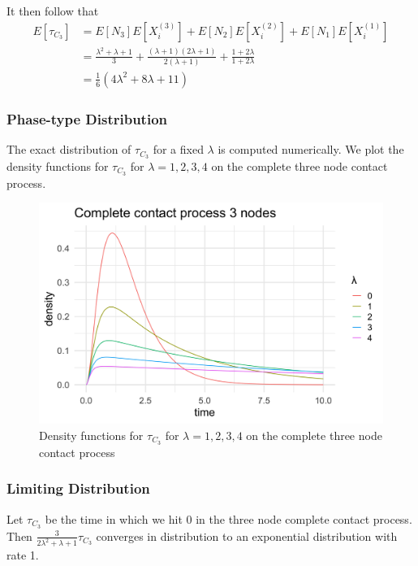 It then follow that
\begin{align*}
        E[\tau_{C_3}] &= E[N_3] E[X_i^{(3)}] + E[N_2] E[X_i^{(2)}] + E[N_1] E[X_i^{(1)}]\\
        &= \frac{\lambda^2 + \lambda + 1}{3} + \frac{(\lambda + 1)(2 \lambda + 1)}{2 (\lambda + 1)} + \frac{1 + 2\lambda}{1 + 2 \lambda}\\
        &= \frac{1}{6}(4 \lambda^2 + 8 \lambda + 11)
\end{align*}

\subsubsection{Phase-type Distribution}

The exact distribution of $\tau_{C_3}$ for a fixed $\lambda$ is computed numerically.
We plot the density functions for $\tau_{C_3}$ for $\lambda = 1, 2, 3, 4$ on the complete three node contact process.

\begin{figure}[H]
  \centering
    \includegraphics[width=.80\textwidth]{figures/complete_3_contact_phase_densities.png}
   \caption{Density functions for $\tau_{C_3}$ for $\lambda = 1, 2, 3, 4$ on the complete three node contact process}
  \label{fig:contact_3_phase_densities}
\end{figure}

\subsubsection{Limiting Distribution}

\begin{theorem}
Let $\tau_{C_3}$ be the time in which we hit 0 in the three node complete contact process.
Then $\frac{3}{2 \lambda^2 + \lambda + 1} \tau_{C_3}$ converges in distribution to an exponential distribution with rate 1.
\end{theorem}


